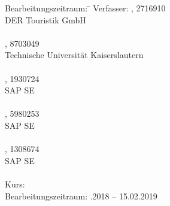 \begin{titlepage}
\begin{center}
\begin{minipage}{\textwidth}
		\begin{tabbing}
			Bearbeitungszeitraum: \hspace{0.85cm}\=\kill
			Verfasser: \> \authorSG, 2716910 \\
			\> DER Touristik GmbH \\
			\> \\
			\> \authorRF, 8703049 \\
			\> Technische Universität Kaiserslautern \\
			\> \\
			\> \authorGP, 1930724 \\
			\> SAP SE \\
			\> \\
			\> \authorEJ, 5980253 \\
			\> SAP SE \\
			\> \\
			\> \authorNL, 1308674 \\
			\> SAP SE \\
			\> \\[1.5mm]
			Kurs: \> \DieKursbezeichnung \\[1.5mm]
			Bearbeitungszeitraum: .2018 -- 15.02.2019
	\end{tabbing}

	\end{minipage}

\end{center}

\end{titlepage}